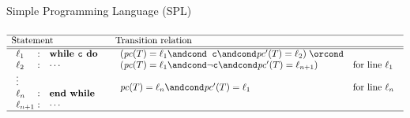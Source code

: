 \documentclass[10pt,notes,compress,usetitleprogressbar,aspectratio=1610]{beamer}
\newcommand{\pc}{\ensuremath{\mathit{pc}}\xspace}
\begin{document}
\begin{frame}{Simple Programming Language (SPL)}
\[
	\begin{array}[t]{ll}
		\hline
		\text{Statement} & \text{Transition relation} \\ \hline\hline
		\begin{array}[t]{l@{\hspace{0.3em}}c@{\hspace{1em}}l}
			\ell_1 & : & \mathtt{\textbf{while } c \textbf{ do }} \\
			\ell_2 & : & \mathtt{\cdots} \\
			\mathtt{\vdots} \\
			\ell_n & : & \mathtt{\textbf{end while}} \\
			\ell_{n+1} & : & \mathtt{\cdots}
		\end{array}
		&
		\begin{array}[t]{ll}
				(\pc(T) = \ell_1 \andcond \;\;\texttt{c} \andcond \pc'(T) = \ell_2) \; 
				\orcond \\
				(\pc(T) = \ell_1 \andcond \lnot \texttt{c} \andcond \pc'(T) = 
			\ell_{n+1})
			& \text{for line $\ell_1$} \\ \\
			\pc(T) = \ell_n \andcond \pc'(T) = \ell_1 &
				\text{for line $\ell_n$}
		 \end{array} \\ \hline
	 \end{array}
\]
\end{frame}
\end{document}
